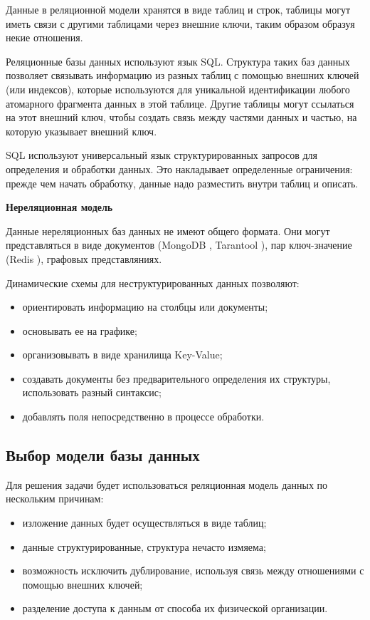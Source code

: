 Данные в реляционной модели хранятся в виде таблиц и строк, таблицы могут иметь связи с другими таблицами через внешние ключи, таким образом образуя некие отношения.

Реляционные базы данных используют язык SQL. Структура таких баз данных позволяет связывать информацию из разных таблиц с помощью внешних ключей (или индексов), которые используются для уникальной идентификации любого атомарного фрагмента данных в этой таблице. Другие таблицы могут ссылаться на этот внешний ключ, чтобы создать связь между частями данных и частью, на которую указывает внешний ключ.

SQL используют универсальный язык структурированных запросов для определения и обработки данных. Это накладывает определенные ограничения: прежде чем начать обработку, данные надо разместить внутри таблиц и описать.

\noindent\textbf{Нереляционная модель}

Данные нереляционных баз данных не имеют общего формата. Они могут представляться в виде документов (MongoDB \cite{mongodb}, Tarantool \cite{tarantool}), пар ключ-значение (Redis \cite{redis}), графовых представляниях.

Динамические схемы для неструктурированных данных позволяют:
\begin{itemize}
    \item ориентировать информацию на столбцы или документы;
    \item основывать ее на графике;
    \item организовывать в виде хранилища Key-Value;
    \item создавать документы без предварительного определения их структуры, использовать разный синтаксис;
    \item добавлять поля непосредственно в процессе обработки.
\end{itemize}

\subsection{Выбор модели базы данных}

Для решения задачи будет использоваться реляционная модель данных по нескольким причинам:

\begin{itemize}
    \item изложение данных будет осуществляться в виде таблиц;
    \item данные структурированные, структура нечасто измяема;
    \item возможность исключить дублирование, используя связь между отношениями с помощью внешних ключей;
    \item разделение доступа к данным от способа их физической организации.
\end{itemize} 


